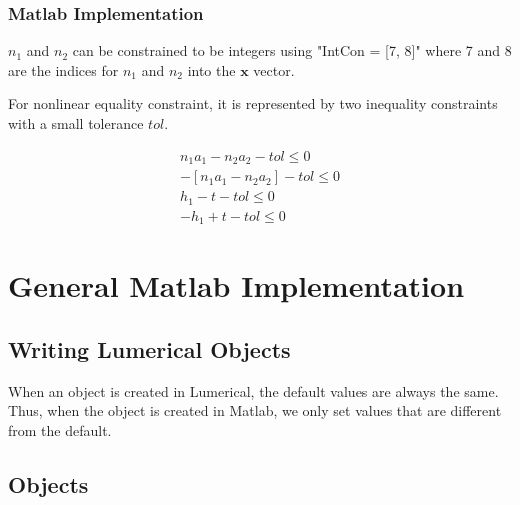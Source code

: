 \documentclass[12pt]{article}
\numberwithin{equation}{section}
\numberwithin{equation}{section}
\begin{document}
\subsubsection{Matlab Implementation}
$n_1$ and $n_2$ can be constrained to be integers using "IntCon = [7, 8]"
where 7 and 8 are the indices for $n_1$ and $n_2$ into the $\mathbf{x}$ vector.  

 For nonlinear equality constraint, it is represented by two inequality constraints with a small tolerance $tol$.
 
 \begin{align}
n_1 a_1 - n_2 a_2 -tol \leq 0\\
- \left [ n_1 a_1 - n_2 a_2 \right ] -tol \leq 0 \\
h_1 - t - tol \leq 0 \\
-h_1 + t - tol \leq 0
\end{align}




\section{General Matlab Implementation}
\subsection{Writing Lumerical Objects}

When an object is created in Lumerical, the default values are always the same.  
Thus, when the object is created in Matlab, we only set values that are different from the default.  
\subsection{Objects}

\end{document}
